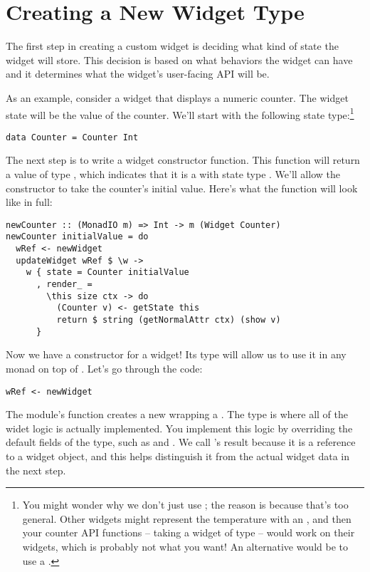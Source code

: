 \section{Creating a New Widget Type}
\label{sec:new_widget_type}

The first step in creating a custom widget is deciding what kind of
state the widget will store.  This decision is based on what behaviors
the widget can have and it determines what the widget's user-facing
API will be.

As an example, consider a widget that displays a numeric counter.  The
widget state will be the value of the counter.  We'll start with the
following state type:\footnote{You might wonder why we don't just use
  ; the reason is because that's too general.  Other widgets
  might represent the temperature with an , and then your
  counter API functions -- taking a widget of type  --
  would work on their widgets, which is probably not what you want!
  An alternative would be to use a .}

\begin{verbatim}
data Counter = Counter Int
\end{verbatim}

The next step is to write a widget constructor function.  This
function will return a value of type , which
indicates that it is a  with state type .
We'll allow the constructor to take the counter's initial value.
Here's what the function will look like in full:

\begin{verbatim}
newCounter :: (MonadIO m) => Int -> m (Widget Counter)
newCounter initialValue = do
  wRef <- newWidget
  updateWidget wRef $ \w ->
    w { state = Counter initialValue
      , render_ =
        \this size ctx -> do
          (Counter v) <- getState this
          return $ string (getNormalAttr ctx) (show v)
      }
\end{verbatim}

Now we have a constructor for a  widget!  Its type will
allow us to use it in any monad on top of .  Let's go through
the code:

\begin{verbatim}
wRef <- newWidget
\end{verbatim}

The  module's  function creates a new
 wrapping a .  The  type is
where all of the widet logic is actually implemented.  You implement
this logic by overriding the default fields of the 
type, such as  and .  We call 's
result  because it is a reference to a widget object, and
this helps distinguish it from the actual widget data in the next
step.

